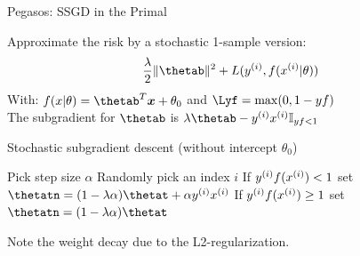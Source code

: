 \begin{vbframe}{Pegasos: SSGD in the Primal}

Approximate the risk by a stochastic 1-sample version: 
\vspace{-0.3cm}
$$ \frac{\lambda}{2} \|\thetab\|^2 + \Lxyit $$
With: $\fxt = \thetab^T \xv + \theta_0$ and $\Lyf = \max(0, 1 -  y f)$\\
The subgradient for $\thetab$ is $\lambda \thetab - \yi \xi \I_{yf < 1}$

\vspace{-0.1cm}

\begin{algorithm}[H]
  \caption*{Stochastic subgradient descent (without intercept $\theta_0$)}
  \begin{algorithmic}[1]
      \State Pick step size $\alpha$
      \State Randomly pick an index $i$
      \State If $y^{(i)} f(x^{(i)}) < 1$ set $\thetatn = (1 - \lambda \alpha) \thetat + \alpha \yi \xi$ 
      \State If $y^{(i)} f(x^{(i)}) \geq 1$ set $\thetatn = (1 - \lambda \alpha) \thetat$ 
      \EndFor
  \end{algorithmic}
\end{algorithm}
\vspace{-0.2cm}
Note the weight decay due to the L2-regularization.
\end{vbframe}

